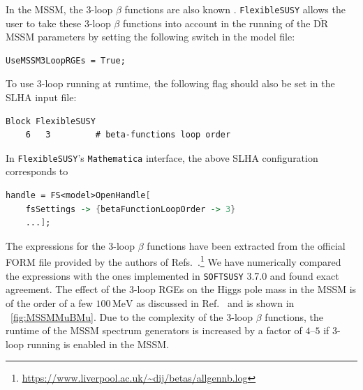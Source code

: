 \documentclass[final,3p,11pt,pdflatex]{elsarticle}
\makeatletter
\newcommand{\fs}{\texttt{FlexibleSUSY}\@\xspace}
\newcommand{\softsusy}{\texttt{SOFTSUSY}\@\xspace}
\newcommand{\mathematica}{\texttt{Ma\-the\-ma\-ti\-ca}\xspace}
\newcommand{\ol}[1]{\overline{#1}}
\newcommand{\DRbar}{\ensuremath{\ol{\text{DR}}}\xspace}
\newcommand{\unit}[1]{\,\text{#1}}      %
\newcommand{\figref}[1]{\figurename~\ref{#1}}
\makeatother
\begin{document}
In the MSSM, the 3-loop $\beta$ functions are also known
\cite{Jack:2003sx,Jack:2004ch}.  \fs allows the user to take these 3-loop
$\beta$ functions into account in the running of the \DRbar MSSM parameters by
setting the following switch in the model file:
%
\begin{lstlisting}
UseMSSM3LoopRGEs = True;
\end{lstlisting}
%
To use 3-loop running at runtime, the following flag should also be set in
the SLHA input file:
%
\begin{lstlisting}
Block FlexibleSUSY
    6   3         # beta-functions loop order
\end{lstlisting}
%
In \fs's \mathematica interface, the above SLHA configuration
corresponds to
%
\begin{lstlisting}[language=Mathematica]
handle = FS<model>OpenHandle[
    fsSettings -> {betaFunctionLoopOrder -> 3}
    ...];
\end{lstlisting}
%
The expressions for the 3-loop $\beta$ functions have been extracted
from the official FORM file provided by the authors of
Refs.~\cite{Jack:2003sx,Jack:2004ch}.\footnote{\url{https://www.liverpool.ac.uk/~dij/betas/allgennb.log}}
We have numerically compared the expressions with the ones implemented
in \softsusy 3.7.0 \cite{Allanach:2014nba} and found exact agreement.
%
The effect of the 3-loop RGEs on the Higgs pole mass in the MSSM is of
the order of a few $100\unit{MeV}$ as discussed in
Ref.~\cite{Allanach:2014nba} and is shown in \figref{fig:MSSMMuBMu}.
%
Due to the complexity of the 3-loop $\beta$ functions, the runtime of
the MSSM spectrum generators is increased by a factor of $4$--$5$ if
3-loop running is enabled in the MSSM\@.
\end{document}
